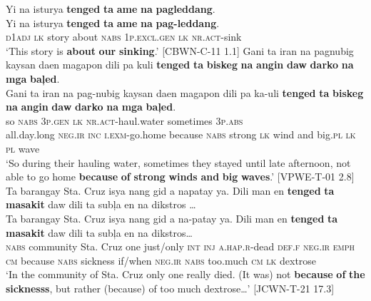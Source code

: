 \ea
Yi  na  isturya  \textbf{tenged}  \textbf{ta}  \textbf{ame}  \textbf{na}  \textbf{pagleddang}. \\\smallskip
 \gll Yi  na  isturya  \textbf{tenged}  \textbf{ta}  \textbf{ame}  \textbf{na}  \textbf{pag-leddang}. \\
\textsc{d}1\textsc{adj}  \textsc{lk}  story  about  \textsc{nabs}  1\textsc{p.excl.gen}  \textsc{lk}  \textsc{nr.act}-sink \\
\glt ‘This story is \textbf{about} \textbf{our} \textbf{sinking}.’ [CBWN-C-11 1.1]\label{bkm:Ref423445020}
\z
\ea
Gani  ta  iran  na  pagnubig  kaysan  daen magapon dili  pa  kuli  \textbf{tenged}  \textbf{ta}  \textbf{biskeg}  \textbf{na}  \textbf{angin}  \textbf{daw}  \textbf{darko} \textbf{na}  \textbf{mga}  \textbf{baļed}. \\\smallskip
 \gll Gani  ta  iran  na  pag-nubig  kaysan  daen magapon dili  pa  ka-uli  \textbf{tenged}  \textbf{ta}  \textbf{biskeg}  \textbf{na}  \textbf{angin}  \textbf{daw}  \textbf{darko} \textbf{na}  \textbf{mga}  \textbf{baļed}. \\
so  \textsc{nabs}  3\textsc{p.gen}  \textsc{lk}  \textsc{nr.act}-haul.water  sometimes  3\textsc{p.abs} \\
all.day.long \textsc{neg.ir}  \textsc{inc}  \textsc{i.exm}-go.home  because  \textsc{nabs}  strong  \textsc{lk}
wind  and  big.\textsc{pl} \textsc{lk}  \textsc{pl}  wave \\
\glt `So during their hauling water, sometimes they stayed until late afternoon, not able to go home \textbf{because} \textbf{of} \textbf{strong} \textbf{winds} \textbf{and} \textbf{big} \textbf{waves}.’ [VPWE-T-01 2.8]
\z
\ea
\label{bkm:Ref443727092}
Ta  barangay  Sta. Cruz  isya  nang  gid  a  napatay  ya.  Dili man  en  \textbf{tenged}  \textbf{ta}  \textbf{masakit}  daw  dili  ta  subļa  en  na  dikstros … \\\smallskip
 \gll Ta  barangay  Sta. Cruz  isya  nang  gid  a  na-patay  ya.  Dili man  en  \textbf{tenged}  \textbf{ta}  \textbf{masakit}  daw  dili  ta  subļa  en  na  dikstros… \\
\textsc{nabs}  community  Sta. Cruz  one  just/only  \textsc{int}  \textsc{inj}  \textsc{a.hap.r}-dead  \textsc{def.f}  \textsc{neg.ir}
\textsc{emph}  \textsc{cm}  because  \textsc{nabs}  sickness  if/when  \textsc{neg.ir}  \textsc{nabs}  too.much  \textsc{cm}  \textsc{lk}  dextrose \\
\glt `In the community of Sta. Cruz only one really died. (It was) not \textbf{because} \textbf{of} \textbf{the} \textbf{sicknesss}, but rather (because) of too much dextrose…’ [JCWN-T-21 17.3]
\z

